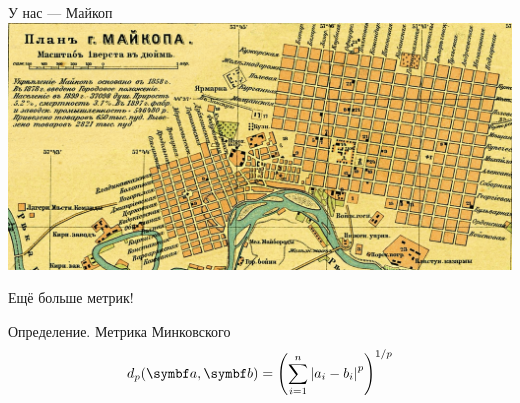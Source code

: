 \begin{frame}{У нас — Майкоп}
\includegraphics[scale=0.5]{figures/video_010_maykop.png}


    

\end{frame}





\begin{frame}{Ещё больше метрик!}

Определение. \alert{Метрика Минковского}
  \[
      d_p(\ba, \bb) = \left(\sum_{i=1}^n \abs{a_i - b_i}^p \right)^{1/p}
  \]
\end{frame}

